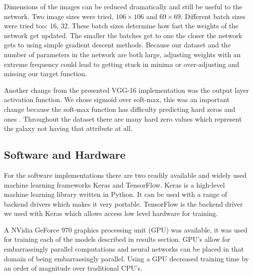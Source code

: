 Dimensions of the images can be reduced dramatically and still be useful to the network. Two image sizes were tried, $106 \times 106$ and $69 \times 69$. Different batch sizes were tried too: 16, 32. These batch sizes determine how fast the weights of the network get updated. The smaller the batches get to one the closer the network gets to using simple gradient descent methods. Because our dataset and the number of parameters in the network are both large, adjusting weights with an extreme frequency could lead to getting stuck in minima or over-adjusting and missing our target function.

Another change from the presented VGG-16 implementation was the output layer activation function. We chose sigmoid over soft-max, this was an important change because the soft-max function has difficulty predicting hard zeros and ones \cite{kaggle-winner}. Throughout the dataset there are many hard zero values which represent the galaxy not having that attribute at all.

\subsection{Software and Hardware}\label{hard-soft-ware}
For the software implementations there are two readily available and widely used machine learning frameworks Keras and TensorFlow. Keras is a high-level machine learning library written in Python. It can be used with a range of backend drivers which makes it very portable. TensorFlow is the backend driver we used with Keras which allows access low level hardware for training.

A NVidia GeForce 970 graphics processing unit (GPU) was available, it was used for training each of the models described in results section. GPU's allow for embarrassingly parallel computations and neural networks can be placed in that domain of being embarrassingly parallel. Using a GPU decreased training time by an order of magnitude over traditional CPU's.
